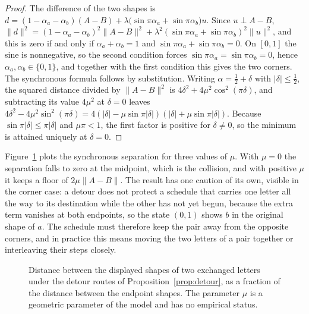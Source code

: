 \begin{proof}
The difference of the two shapes is $d=(1-\alpha_a-\alpha_b)(A-B)+\lambda\bigl(\sin\pi\alpha_a+\sin\pi\alpha_b\bigr)u$. Since $u\perp A-B$, $\|d\|^2=(1-\alpha_a-\alpha_b)^2\|A-B\|^2+\lambda^2(\sin\pi\alpha_a+\sin\pi\alpha_b)^2\|u\|^2$, and this is zero if and only if $\alpha_a+\alpha_b=1$ and $\sin\pi\alpha_a+\sin\pi\alpha_b=0$. On $[0,1]$ the sine is nonnegative, so the second condition forces $\sin\pi\alpha_a=\sin\pi\alpha_b=0$, hence $\alpha_a,\alpha_b\in\{0,1\}$, and together with the first condition this gives the two corners. The synchronous formula follows by substitution. Writing $\alpha=\tfrac12+\delta$ with $|\delta|\le\tfrac12$, the squared distance divided by $\|A-B\|^2$ is $4\delta^2+4\mu^2\cos^2(\pi\delta)$, and subtracting its value $4\mu^2$ at $\delta=0$ leaves $4\delta^2-4\mu^2\sin^2(\pi\delta)=4(|\delta|-\mu\sin\pi|\delta|)(|\delta|+\mu\sin\pi|\delta|)$. Because $\sin\pi|\delta|\le\pi|\delta|$ and $\mu\pi<1$, the first factor is positive for $\delta\ne0$, so the minimum is attained uniquely at $\delta=0$.
\end{proof}

Figure~\ref{fig:sep} plots the synchronous separation for three values of $\mu$. With $\mu=0$ the separation falls to zero at the midpoint, which is the collision, and with positive $\mu$ it keeps a floor of $2\mu\|A-B\|$. The result has one caution of its own, visible in the corner case: a detour does not protect a schedule that carries one letter all the way to its destination while the other has not yet begun, because the extra term vanishes at both endpoints, so the state $(0,1)$ shows $b$ in the original shape of $a$. The schedule must therefore keep the pair away from the opposite corners, and in practice this means moving the two letters of a pair together or interleaving their steps closely.

\begin{figure}[ht]
\centering
{}
\caption{Distance between the displayed shapes of two exchanged letters under the detour routes of Proposition~\ref{prop:detour}, as a fraction of the distance between the endpoint shapes. The parameter $\mu$ is a geometric parameter of the model and has no empirical status.}\label{fig:sep}
\end{figure}

